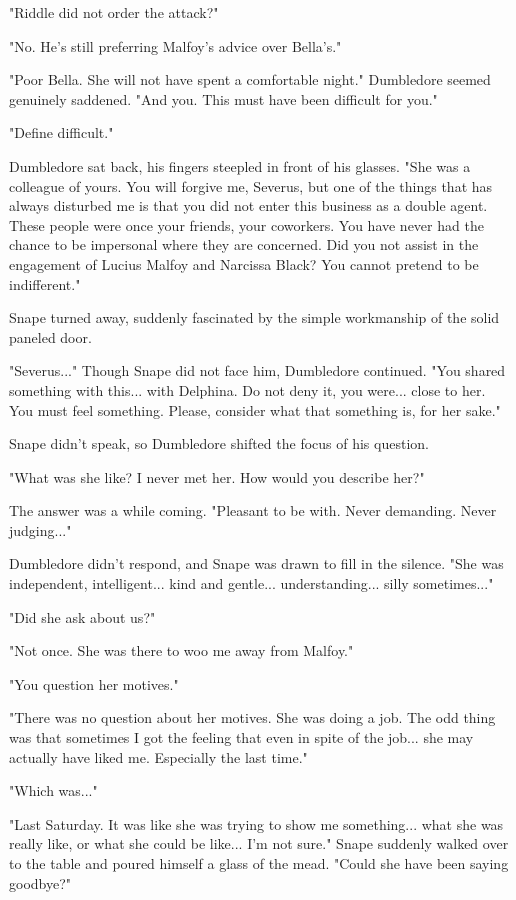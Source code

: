 \documentclass[a4paper,11pt]{article}
\begin{document}
"Riddle did not order the attack?"

"No. He's still preferring Malfoy's advice over Bella's."

"Poor Bella. She will not have spent a comfortable night." Dumbledore seemed genuinely saddened. "And you. This must have been difficult for you."

"Define difficult."

Dumbledore sat back, his fingers steepled in front of his glasses. "She was a colleague of yours. You will forgive me, Severus, but one of the things that has always disturbed me is that you did not enter this business as a double agent. These people were once your friends, your coworkers. You have never had the chance to be impersonal where they are concerned. Did you not assist in the engagement of Lucius Malfoy and Narcissa Black? You cannot pretend to be indifferent."

Snape turned away, suddenly fascinated by the simple workmanship of the solid paneled door.

"Severus..." Though Snape did not face him, Dumbledore continued. "You shared something with this... with Delphina. Do not deny it, you were... close to her. You must feel something. Please, consider what that something is, for her sake."

Snape didn't speak, so Dumbledore shifted the focus of his question.

"What was she like? I never met her. How would you describe her?"

The answer was a while coming. "Pleasant to be with. Never demanding. Never judging..."

Dumbledore didn't respond, and Snape was drawn to fill in the silence. "She was independent, intelligent... kind and gentle... understanding... silly sometimes..."

"Did she ask about us?"

"Not once. She was there to woo me away from Malfoy."

"You question her motives."

"There was no question about her motives. She was doing a job. The odd thing was that sometimes I got the feeling that even in spite of the job... she may actually have liked me. Especially the last time."

"Which was..."

"Last Saturday. It was like she was trying to show me something... what she was really like, or what she could be like... I'm not sure." Snape suddenly walked over to the table and poured himself a glass of the mead. "Could she have been saying goodbye?"
\end{document}
